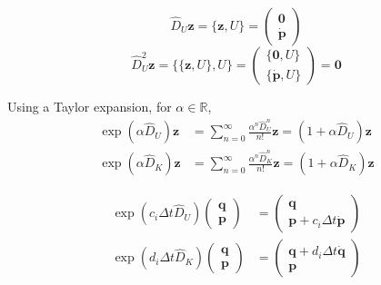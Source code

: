 \documentclass{article}
\newcommand{\bb}[1]{\mathbb{#1}}
\renewcommand{\vec}[1]{\boldsymbol{#1}}
\begin{document}
\begin{equation}
	\hat{D}_U \vec{z} = \{ \vec{z}, U \} =
\begin{pmatrix}
	\vec{0} \\
	\dot{\vec{p}}
\end{pmatrix}
\end{equation}
\begin{equation}
	\hat{D}_U^2 \vec{z} = \{ \{ \vec{z}, U \}, U \} =
	\begin{pmatrix}
		\{ \vec{0}, U \} \\
		\{ \dot{\vec{p}}, U \}
	\end{pmatrix} = \vec{0}
\end{equation}

Using a Taylor expansion, for $\alpha \in \bb{R}$,
\begin{align*}
	\exp(\alpha\hat{D}_U) \vec{z} &= \sum_{n=0}^{\infty} \frac{\alpha^n\hat{D}_U^n}{n!} \vec{z} = (1 + \alpha\hat{D}_U) \vec{z} \\
	\exp(\alpha\hat{D}_K) \vec{z} &= \sum_{n=0}^{\infty} \frac{\alpha^n\hat{D}_K^n}{n!} \vec{z} = (1 + \alpha\hat{D}_K) \vec{z}
\end{align*}

\begin{align*}
	\exp(c_i \Delta t \hat{D}_U) \begin{pmatrix} \vec{q} \\ \vec{p} \end{pmatrix} &= \begin{pmatrix} \vec{q} \\ \vec{p} + c_i \Delta t \dot{\vec{p}}\end{pmatrix} \\
	\exp(d_i \Delta t \hat{D}_K) \begin{pmatrix} \vec{q} \\ \vec{p} \end{pmatrix} &= \begin{pmatrix} \vec{q} + d_i \Delta t \dot{\vec{q}} \\ \vec{p} \end{pmatrix}
\end{align*}



\end{document}
